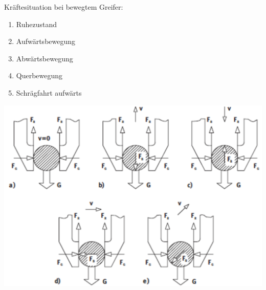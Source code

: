 \begin{minipage}{0.5\linewidth}
    Kräftesituation bei bewegtem Greifer:
    \begin{enumerate}[label=\alph*)]
        \item Ruhezustand
        \item Aufwärtsbewegung
        \item Abwärtsbewegung
        \item Querbewegung
        \item Schrägfahrt aufwärts
    \end{enumerate}
\end{minipage}
\begin{minipage}{0.5\linewidth}
    \vspace{-2cm}
    \includegraphics[width=\linewidth]{./bilder/GreiferKraft}
\end{minipage}


